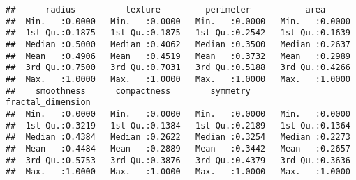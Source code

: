 \documentclass[]{article}
\begin{document}
\begin{verbatim}
##      radius          texture         perimeter           area       
##  Min.   :0.0000   Min.   :0.0000   Min.   :0.0000   Min.   :0.0000  
##  1st Qu.:0.1875   1st Qu.:0.1875   1st Qu.:0.2542   1st Qu.:0.1639  
##  Median :0.5000   Median :0.4062   Median :0.3500   Median :0.2637  
##  Mean   :0.4906   Mean   :0.4519   Mean   :0.3732   Mean   :0.2989  
##  3rd Qu.:0.7500   3rd Qu.:0.7031   3rd Qu.:0.5188   3rd Qu.:0.4266  
##  Max.   :1.0000   Max.   :1.0000   Max.   :1.0000   Max.   :1.0000  
##    smoothness      compactness        symmetry      fractal_dimension
##  Min.   :0.0000   Min.   :0.0000   Min.   :0.0000   Min.   :0.0000   
##  1st Qu.:0.3219   1st Qu.:0.1384   1st Qu.:0.2189   1st Qu.:0.1364   
##  Median :0.4384   Median :0.2622   Median :0.3254   Median :0.2273   
##  Mean   :0.4484   Mean   :0.2889   Mean   :0.3442   Mean   :0.2657   
##  3rd Qu.:0.5753   3rd Qu.:0.3876   3rd Qu.:0.4379   3rd Qu.:0.3636   
##  Max.   :1.0000   Max.   :1.0000   Max.   :1.0000   Max.   :1.0000
\end{verbatim}
\end{document}
